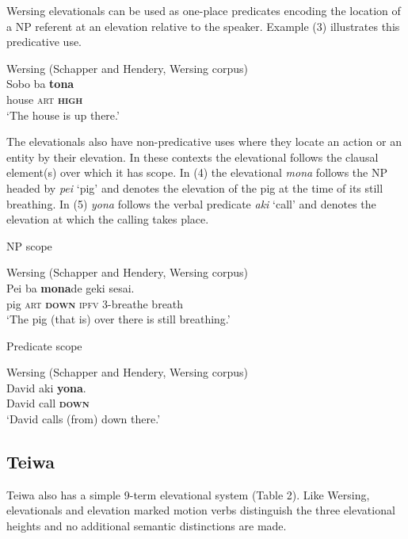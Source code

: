 Wersing elevationals can be used as one-place predicates encoding the location of a NP referent at an elevation relative to the speaker. Example (3) illustrates this predicative use.


\ea%
\label{ex:3}
  Wersing (Schapper and Hendery, Wersing corpus)\\
\gll Sobo  ba  \textbf{{tona}}\\
        house  \textsc{art} \textbf{\textsc{high}} \\
\glt`The house is up there.'
\z







The elevationals also have non-predicative uses where they locate an action or an entity by their elevation. In these contexts the elevational follows the clausal element(s) over which it has scope. In (4) the elevational \textit{mona} follows the NP headed by \textit{pei} `pig' and denotes the elevation of the pig at the time of its still breathing. In (5) \textit{yona} follows the verbal predicate \textit{aki} `call' and denotes the elevation at which the calling takes place.

 NP scope



\ea%
\label{ex:4}
  Wersing (Schapper and Hendery, Wersing corpus)\\
\gll Pei   ba  \textbf{{mona}}{de}  geki{\ng}  sesai.\\
       pig  \textsc{art} \textbf{\textsc{down}} \textsc{ipfv} \textsc{3-}breathe  breath \\
\glt  `The pig (that is) over there is still breathing.'
\z







Predicate scope



\ea%
\label{ex:5}
  Wersing (Schapper and Hendery, Wersing corpus)\\
\gll David   aki  \textbf{{yona}}{.} \\
       David  call  \textbf{\textsc{down}} \\
\glt `David calls (from) down there.'
\z







\subsection{Teiwa}
Teiwa also has a simple 9-term elevational system (Table 2). Like Wersing, elevationals and elevation marked motion verbs distinguish the three elevational heights and no additional semantic distinctions are made.



